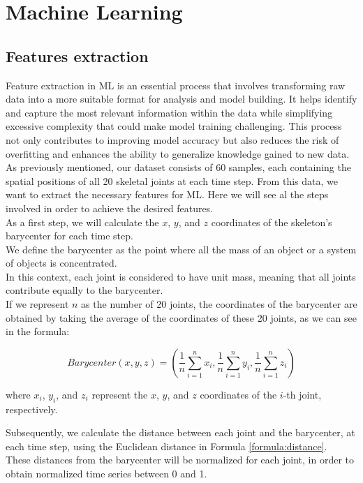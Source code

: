 \chapter{Machine Learning}

\section{Features extraction}
Feature extraction in ML is an essential process that involves transforming raw data into a more suitable format for analysis and model building.
It helps identify and capture the most relevant information within the data while simplifying excessive complexity that could make model training challenging.
This process not only contributes to improving model accuracy but also reduces the risk of overfitting and enhances the ability to generalize knowledge gained to new data. \\
As previously mentioned, our dataset consists of 60 samples, each containing the spatial positions of all 20 skeletal joints at each time step.
From this data, we want to extract the necessary features for ML.
Here we will see al the steps involved in order to achieve the desired features. \\

As a first step, we will calculate the $x$, $y$, and $z$ coordinates of the skeleton's barycenter for each time step. \\
We define the barycenter as the point where all the mass of an object or a system of objects is concentrated. \\
In this context, each joint is considered to have unit mass, meaning that all joints contribute equally to the barycenter. \\
If we represent $n$ as the number of 20 joints, the coordinates of the barycenter are obtained by taking the average of the coordinates of these 20 joints, as we can see in the formula:


\begin{equation}
    Barycenter (x, y, z) = \left(\frac{1}{n} \sum_{i=1}^{n} x_i, \frac{1}{n} \sum_{i=1}^{n} y_i, \frac{1}{n} \sum_{i=1}^{n} z_i\right)
    \label{formula:baricentro}
\end{equation}
    
where $x_i$, $y_i$, and $z_i$ represent the $x$, $y$, and $z$ coordinates of the $i$-th joint, respectively.

Subsequently, we calculate the distance between each joint and the barycenter, at each time step, using the Euclidean distance in Formula \ref{formula:distance}. \\
These distances from the barycenter will be normalized for each joint, in order to obtain normalized time series between 0 and 1.

